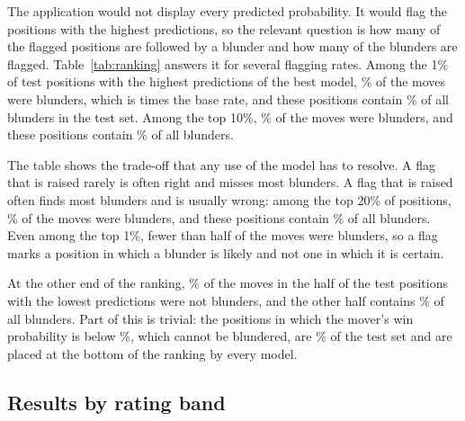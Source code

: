 \documentclass[11pt]{article}
\begin{document}
The application would not display every predicted probability. It would flag
the positions with the highest predictions, so the relevant question is how
many of the flagged positions are followed by a blunder and how many of the
blunders are flagged. Table~\ref{tab:ranking} answers it for several flagging
rates. Among the 1\% of test positions with the highest predictions of the
best model, \% of the moves were blunders, which is
 times the base rate, and these positions contain
\% of all blunders in the test set. Among the top 10\%,
\% of the moves were blunders, and these positions
contain \% of all blunders.

\begin{table}[htbp]\centering\small
{}
\caption{Precision and recall at the top of the ranking. For a share of the
test positions taken from the highest predicted probabilities:
\emph{precision} is the share of these positions in which the move was a
blunder, \emph{recall} is the share of all blunders that they contain, and
\emph{lift} is the precision divided by the base rate.}
\label{tab:ranking}
\end{table}

The table shows the trade-off that any use of the model has to resolve. A
flag that is raised rarely is often right and misses most blunders. A flag
that is raised often finds most blunders and is usually wrong: among the top
20\% of positions, \% of the moves were blunders, and
these positions contain \% of all blunders. Even among
the top 1\%, fewer than half of the moves were blunders, so a flag marks a
position in which a blunder is likely and not one in which it is certain.

At the other end of the ranking, \% of the moves in
the half of the test positions with the lowest predictions were not blunders,
and the other half contains \% of all blunders. Part of
this is trivial: the positions in which the mover's win probability is below
\%, which cannot be blundered, are
\% of the test set and are placed at the bottom of
the ranking by every model.
\fi

\subsection{Results by rating band}
\end{document}
